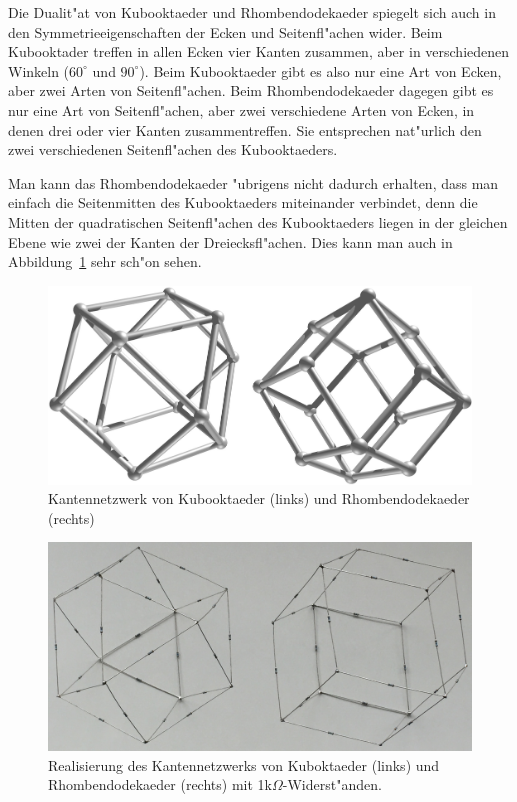 \documentclass[a4paper,12pt]{article}
\begin{document}
Die Dualit"at von Kubooktaeder und Rhombendodekaeder spiegelt sich auch in
den Symmetrieeigenschaften der Ecken und Seitenfl"achen wider.
Beim Kubooktader treffen in allen Ecken vier Kanten zusammen, aber in
verschiedenen Winkeln ($60^\circ$ und $90^\circ$).
Beim Kubooktaeder gibt es also nur eine Art von Ecken, aber zwei Arten von
Seitenfl"achen.
Beim Rhombendodekaeder dagegen gibt es nur eine Art von Seitenfl"achen,
aber zwei verschiedene Arten von Ecken, in denen drei oder vier
Kanten zusammentreffen.
Sie entsprechen nat"urlich den zwei verschiedenen Seitenfl"achen des 
Kubooktaeders.

Man kann das Rhombendodekaeder "ubrigens nicht dadurch erhalten, dass man
einfach die Seitenmitten des Kubooktaeders miteinander verbindet, denn die
Mitten der quadratischen Seitenfl"achen des Kubooktaeders liegen in der
gleichen Ebene wie zwei der Kanten der Dreiecksfl"achen.
Dies kann man auch in Abbildung~\ref{kantennetzwerke} sehr sch"on sehen.

\begin{figure}
\centering
\includegraphics[width=\hsize]{kubooktaeder.jpg}
\caption{Kantennetzwerk von Kubooktaeder (links) und Rhombendodekaeder (rechts)
\label{kantennetzwerke}}
\end{figure}
\begin{figure}
\centering
\includegraphics[width=\hsize]{realization.jpg}
\caption{Realisierung des Kantennetzwerks von Kuboktaeder (links)
und Rhombendodekaeder (rechts) mit 1k$\Omega$-Widerst"anden.
\label{realization}}
\end{figure}
\end{document}
